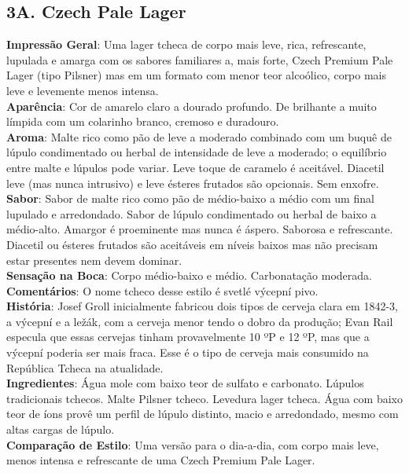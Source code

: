 \subsection*{3A. Czech Pale Lager}
\textbf{Impressão Geral}: Uma lager tcheca de corpo mais leve, rica, refrescante, lupulada e amarga com os sabores familiares a, mais forte, Czech Premium Pale Lager (tipo Pilsner) mas em um formato com menor teor alcoólico, corpo mais leve e levemente menos intensa. \\
\textbf{Aparência}: Cor de amarelo claro a dourado profundo. De brilhante a muito límpida com um colarinho branco, cremoso e duradouro. \\
\textbf{Aroma}: Malte rico como pão de leve a moderado combinado com um buquê de lúpulo condimentado ou herbal de intensidade de leve a moderado; o equilíbrio entre malte e lúpulos pode variar. Leve toque de caramelo é aceitável. Diacetil leve (mas nunca intrusivo) e leve ésteres frutados são opcionais. Sem enxofre. \\
\textbf{Sabor}: Sabor de malte rico como pão de médio-baixo a médio com um final lupulado e arredondado. Sabor de lúpulo condimentado ou herbal de baixo a médio-alto. Amargor é proeminente mas nunca é áspero. Saborosa e refrescante. Diacetil ou ésteres frutados são aceitáveis em níveis baixos mas não precisam estar presentes nem devem dominar. \\
\textbf{Sensação na Boca}: Corpo médio-baixo e médio. Carbonatação moderada. \\
\textbf{Comentários}: O nome tcheco desse estilo é svetlé výcepní pivo. \\
\textbf{História}: Josef Groll inicialmente fabricou dois tipos de cerveja clara em 1842-3, a výcepní e a ležák, com a cerveja menor tendo o dobro da produção; Evan Rail especula que essas cervejas tinham provavelmente 10 ºP e 12 ºP, mas que a výcepní poderia ser mais fraca. Esse é o tipo de cerveja mais consumido na República Tcheca na atualidade. \\
\textbf{Ingredientes}: Água mole com baixo teor de sulfato e carbonato. Lúpulos tradicionais tchecos. Malte Pilsner tcheco. Levedura lager tcheca. Água com baixo teor de íons provê um perfil de lúpulo distinto, macio e arredondado, mesmo com altas cargas de lúpulo. \\
\textbf{Comparação de Estilo}: Uma versão para o dia-a-dia, com corpo mais leve, menos intensa e refrescante de uma Czech Premium Pale Lager. \\
